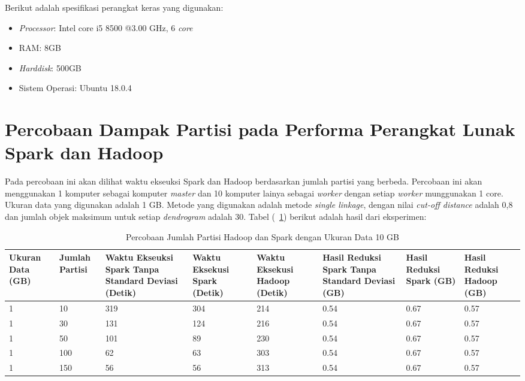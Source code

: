 Berikut adalah spesifikasi perangkat keras yang digunakan:

\begin{itemize}

\item \textit{Processor}: Intel core i5 8500 @3.00 GHz, 6 \textit{core}

\item RAM: 8GB

\item \textit{Harddisk}: 500GB

\item Sistem Operasi: Ubuntu 18.0.4

\end{itemize}






\section{Percobaan Dampak Partisi pada Performa Perangkat Lunak Spark dan Hadoop} 

Pada percobaan ini akan dilihat waktu ekseuksi Spark dan Hadoop berdasarkan jumlah partisi yang berbeda. Percobaan ini akan menggunakan 1 komputer sebagai komputer \textit{master} dan 10 komputer lainya sebagai \textit{worker} dengan setiap \textit{worker} munggunakan 1 core. Ukuran data yang digunakan adalah 1 GB. Metode yang digunakan adalah metode \textit{single linkage}, dengan nilai \textit{cut-off distance} adalah 0,8 dan jumlah objek maksimum untuk setiap \textit{dendrogram} adalah 30. Tabel (~\ref{tab:spark1}) berikut adalah hasil dari eksperimen:

\begin{table}[H] 
	\centering 
	\caption{Percobaan Jumlah Partisi Hadoop dan Spark dengan Ukuran Data 10 GB}
	\label{tab:spark1}
	\begin{tabular}{|p{1.5cm}|p{1.5cm}|p{3cm}|p{3cm}|p{3cm}|p{2cm}|p{2cm}|p{2cm}|}
\hline
Ukuran Data (GB) & Jumlah Partisi &  Waktu Ekseuksi Spark Tanpa Standard Deviasi (Detik) & Waktu Eksekusi Spark (Detik) & Waktu Eksekusi Hadoop (Detik) & Hasil Reduksi Spark Tanpa Standard Deviasi (GB) & Hasil Reduksi Spark (GB)  & Hasil Reduksi Hadoop (GB)\\ 
\hline
1 & 10 & 319 & 304 & 214 & 0.54 & 0.67 & 0.57 \\
\hline
1 & 30 & 131 & 124 & 216 & 0.54 & 0.67 & 0.57 \\
\hline
1 & 50 & 101 & 89 & 230 & 0.54 & 0.67 & 0.57 \\
\hline
1 & 100 & 62 & 63 & 303 & 0.54 & 0.67 & 0.57 \\
\hline
1 & 150 & 56 & 56 & 313 & 0.54 & 0.67 & 0.57 \\
\hline

\hline

	\end{tabular} 
\end{table}




